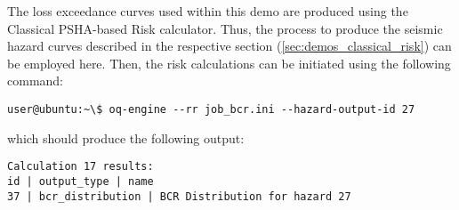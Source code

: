 The loss exceedance curves used within this demo are produced using the Classical PSHA-based Risk calculator. Thus, the process to produce the seismic hazard curves described in the respective section (\ref{sec:demos_classical_risk}) can be employed here. Then, the risk calculations can be initiated using the following command:

\begin{Verbatim}[frame=single, commandchars=\\\{\}, samepage=true]
user@ubuntu:~\$ oq-engine --rr job_bcr.ini --hazard-output-id 27
\end{Verbatim}

which should produce the following output:

\begin{Verbatim}[frame=single, commandchars=\\\{\}, samepage=true]
Calculation 17 results:
id | output_type | name
37 | bcr_distribution | BCR Distribution for hazard 27
\end{Verbatim}
